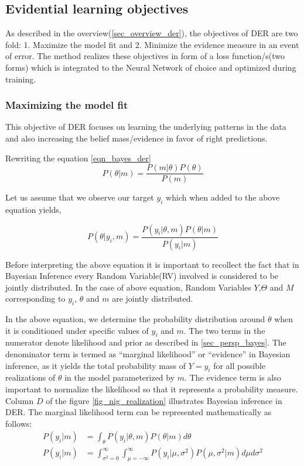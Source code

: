 	\subsection{Evidential learning objectives}\label{sec_evi_learning_objectives}
	As described in the overview(\ref{sec_overview_der}), the objectives of DER are two fold: 1. Maximize the model fit and 2. Minimize the evidence measure in an event of error. The method realizes these objectives in form of a loss function/s(two forms) which is integrated to the Neural Network of choice and optimized during training. 
	
	\subsubsection{Maximizing the model fit}
	This objective of DER focuses on learning the underlying patterns in the data and also increasing the belief mass/evidence in favor of right predictions.
	
	Rewriting the equation \ref{eqn_bayes_der}
	\begin{equation*}
		P(\theta|m) = \frac{P(m|\theta)P(\theta)}{P(m)}
	\end{equation*}
	
	Let us assume that we observe our target $y_i$ which when added to the above equation yields,
	
	\begin{equation}
		P(\theta|y_i,m) = \frac{P(y_i|\theta,m)P(\theta|m)}{P(y_i|m)}
	\end{equation}
	
	Before interpreting the above equation it is important to recollect the fact that in Bayesian Inference every Random Variable(RV) involved is considered to be jointly distributed. In the case of above equation, Random Variables $Y$,$\Theta$ and $M$ corresponding to $y_i$, $\theta$ and $m$ are jointly distributed.
	
	In the above equation, we determine the probability distribution around $\theta$ when it is conditioned under specific values of  $y_i$ and $m$. The two terms in the numerator denote likelihood and prior as described in \ref{sec_persp_bayes}. The denominator term is termed as \enquote{marginal likelihood} or \enquote{evidence} in Bayesian inference, as it yields the total probability mass  of $Y=y_i$ for all possible realizations of $\theta$ in the model parameterized by $m$. The evidence term is also important to normalize the likelihood so that it represents a probability measure. Column $D$ of the figure \ref{fig_nig_realization} illustrates Bayesian inference in DER.
	The marginal likelihood term can be represented mathematically as follows:
	\begin{align}
		P(y_i|m) &= \int_{\theta}P(y_i|\theta,m)P(\theta|m)d\theta	\\
		P(y_i|m) &=\int_{\sigma^2=0}^{\infty}\int_{\mu=-\infty}^{\infty}P(y_i|\mu,\sigma^2)P(\mu,\sigma^2|m)d\mu d\sigma^2
	\end{align}
	
